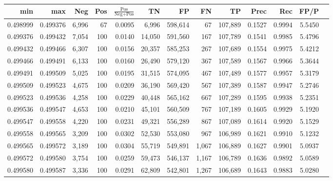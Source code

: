 \begin{tabular}{rrrrrrrrrrrrr}
\toprule
     min &      max &   Neg & Pos & $\frac{\text{Pos}}{\text{Neg}+\text{Pos}}$ &      TN &      FP &      FN &      TP &   Prec &    Rec &   FP/P \\
\midrule
0.498999 & 0.499376 & 6,996 &  67 &                                     0.0095 &   6,996 & 598,614 &      67 & 107,889 & 0.1527 & 0.9994 & 5.5450 \\
0.499376 & 0.499432 & 7,054 & 100 &                                     0.0140 &  14,050 & 591,560 &     167 & 107,789 & 0.1541 & 0.9985 & 5.4796 \\
0.499432 & 0.499466 & 6,307 & 100 &                                     0.0156 &  20,357 & 585,253 &     267 & 107,689 & 0.1554 & 0.9975 & 5.4212 \\
0.499466 & 0.499491 & 6,133 & 100 &                                     0.0160 &  26,490 & 579,120 &     367 & 107,589 & 0.1567 & 0.9966 & 5.3644 \\
0.499491 & 0.499509 & 5,025 & 100 &                                     0.0195 &  31,515 & 574,095 &     467 & 107,489 & 0.1577 & 0.9957 & 5.3179 \\
0.499509 & 0.499523 & 4,675 & 100 &                                     0.0209 &  36,190 & 569,420 &     567 & 107,389 & 0.1587 & 0.9947 & 5.2746 \\
0.499523 & 0.499536 & 4,258 & 100 &                                     0.0229 &  40,448 & 565,162 &     667 & 107,289 & 0.1595 & 0.9938 & 5.2351 \\
0.499536 & 0.499547 & 4,653 & 100 &                                     0.0210 &  45,101 & 560,509 &     767 & 107,189 & 0.1605 & 0.9929 & 5.1920 \\
0.499547 & 0.499558 & 4,220 & 100 &                                     0.0231 &  49,321 & 556,289 &     867 & 107,089 & 0.1614 & 0.9920 & 5.1529 \\
0.499558 & 0.499565 & 3,209 & 100 &                                     0.0302 &  52,530 & 553,080 &     967 & 106,989 & 0.1621 & 0.9910 & 5.1232 \\
0.499565 & 0.499572 & 3,189 & 100 &                                     0.0304 &  55,719 & 549,891 &   1,067 & 106,889 & 0.1627 & 0.9901 & 5.0937 \\
0.499572 & 0.499580 & 3,754 & 100 &                                     0.0259 &  59,473 & 546,137 &   1,167 & 106,789 & 0.1636 & 0.9892 & 5.0589 \\
0.499580 & 0.499587 & 3,336 & 100 &                                     0.0291 &  62,809 & 542,801 &   1,267 & 106,689 & 0.1643 & 0.9883 & 5.0280 \\

\end{tabular}
